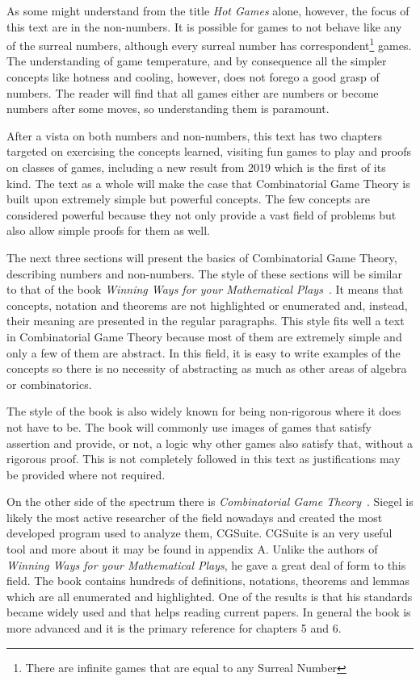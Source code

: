 As some might understand from the title \textit{Hot Games} alone, however, the focus of this text are in the non-numbers. It is possible for games to not behave like any of the surreal numbers, although every surreal number has correspondent\footnote{There are infinite games that are equal to any Surreal Number} games. The understanding of game temperature, and by consequence all the simpler concepts like hotness and cooling, however, does not forego a good grasp of numbers. The reader will find that all games either are numbers or become numbers after some moves, so understanding them is paramount.

After a vista on both numbers and non-numbers, this text has two chapters targeted on exercising the concepts learned, visiting fun games to play and proofs on classes of games, including a new result from 2019 which is the first of its kind. The text as a whole will make the case that Combinatorial Game Theory is built upon extremely simple but powerful concepts. The few concepts are considered powerful because they not only provide a vast field of problems but also allow simple proofs for them as well.

The next three sections will present the basics of Combinatorial Game Theory, describing numbers and non-numbers. The style of these sections will be similar to that of the book \textit{Winning Ways for your Mathematical Plays}~\cite{WW}. It means that concepts, notation and theorems are not highlighted or enumerated and, instead, their meaning are presented in the regular paragraphs. This style fits well a text in Combinatorial Game Theory because most of them are extremely simple and only a few of them are abstract. In this field, it is easy to write examples of the concepts so there is no necessity of abstracting as much as other areas of algebra or combinatorics.

The style of the book is also widely known for being non-rigorous where it does not have to be. The book will commonly use images of games that satisfy assertion and provide, or not, a logic why other games also satisfy that, without a rigorous proof. This is not completely followed in this text as justifications may be provided where not required. 

On the other side of the spectrum there is \textit{Combinatorial Game Theory}~\cite{CGT}. Siegel is likely the most active researcher of the field nowadays and created the most developed program used to analyze them, CGSuite. CGSuite is an very useful tool and more about it may be found in appendix A. Unlike the authors of \textit{Winning Ways for your Mathematical Plays}, he gave a great deal of form to this field. The book contains hundreds of definitions, notations, theorems and lemmas which are all enumerated and highlighted. One of the results is that his standards became widely used and that helps reading current papers. In general the book is more advanced and it is the primary reference for chapters 5 and 6.

